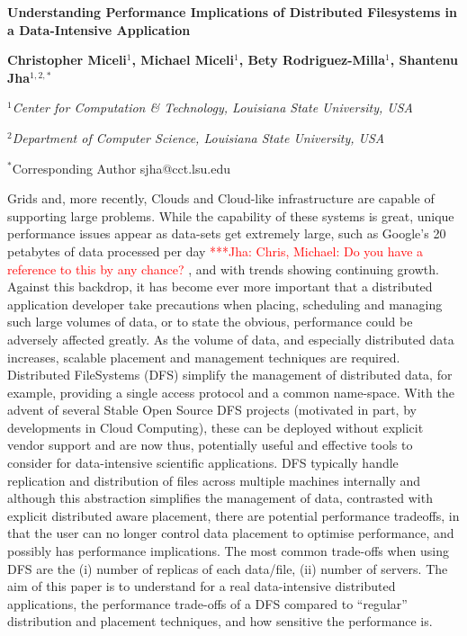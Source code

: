 \documentclass[a4paper,11pt]{article}
\newcommand{\jhanote}[1]{ {\textcolor{red} { ***Jha: #1 }}}
\newcommand{\jhanote}[1]{}
\begin{document}
\begin{center}

\textbf{\large Understanding Performance Implications of Distributed Filesystems in a Data-Intensive Application}

\vspace{0.05in}

\textbf{Christopher Miceli$^{1}$, Michael Miceli$^{1}$, Bety Rodriguez-Milla$^{1}$, Shantenu Jha$^{1,2,*}$}

\small{\emph{$^{1}$Center for Computation \& Technology, Louisiana State University, USA}}

\small{\emph{$^{2}$Department of Computer Science, Louisiana State University, USA}}

{\footnotesize {\hspace{0.0 in} $^*$Corresponding Author sjha@cct.lsu.edu}}

\end{center}


Grids and, more recently, Clouds and Cloud-like infrastructure are capable of supporting large problems. While the capability of these systems is great, unique performance issues appear as data-sets get extremely large, such as Google's 20 petabytes of data processed per day\jhanote{Chris, Michael: Do you have a reference to this by any chance?}, and with trends showing continuing growth. Against this backdrop, it has become ever more important that a distributed application developer take precautions when placing, scheduling and managing such large volumes of data, or to state the obvious, performance could be adversely affected greatly. As the volume of data, and especially distributed data increases, scalable placement and management techniques are required.  Distributed FileSystems (DFS) simplify the management of distributed data, for example, providing a single access protocol and a common name-space. With the advent of several Stable Open Source DFS projects (motivated in part, by developments in Cloud Computing), these can be deployed without explicit vendor support and are now thus, potentially useful and effective tools to consider for data-intensive scientific applications.  DFS typically handle replication and distribution of files across multiple machines internally and although this abstraction simplifies the management of data, contrasted with explicit distributed aware placement, there are potential performance tradeoffs, in that the user can no longer control data placement to optimise performance, and possibly has performance implications.  The most common trade-offs when using DFS are the (i) number of replicas of each data/file, (ii) number of servers.  The aim of this paper is to understand for a real data-intensive distributed applications, the performance trade-offs of a DFS compared to ``regular'' distribution and placement techniques, and how sensitive the performance is.
\end{document}
